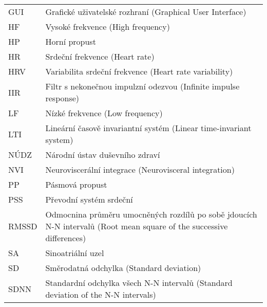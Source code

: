 \begin{table}[h]
\begin{center}
\begin{tabular}{p{2.5cm}p{12.25cm}}
			GUI     & Grafické uživatelské rozhraní (Graphical User Interface)                                                             \\
			HF      & Vysoké frekvence (High frequency)                                                                                    \\
			HP      & Horní propust                                                                                                        \\
			HR      & Srdeční frekvence (Heart rate)                                                                                       \\
			HRV     & Variabilita srdeční frekvence (Heart rate variability)                                                               \\
			IIR     & Filtr s nekonečnou impulzní odezvou (Infinite impulse response)                                                      \\
			LF      & Nízké frekvence (Low frequency)                                                                                      \\
			LTI     & Lineární časově invariantní systém (Linear time-invariant system)                                                    \\
			NÚDZ    & Národní ústav duševního zdraví                                                                                       \\
			NVI     & Neuroviscerální integrace (Neurovisceral integration)                                                                \\
			PP      & Pásmová propust                                                                                                      \\
			PSS     & Převodní systém srdeční                                                                                              \\
			RMSSD   & Odmocnina průměru umocněných rozdílů po sobě jdoucích N-N intervalů (Root mean square of the successive differences) \\
			SA      & Sinoatriální uzel                                                                                                    \\
			SD      & Směrodatná odchylka (Standard deviation)                                                                             \\
			SDNN    & Standardní odchylka všech N-N intervalů (Standard deviation of the N-N intervals)                                    \\

\end{tabular}
\end{center}
\end{table}
